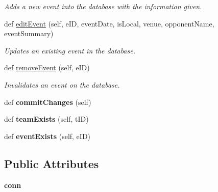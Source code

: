 \begin{DoxyCompactItemize}
\begin{DoxyCompactList}\small\item\em Adds a new event into the database with the information given. \end{DoxyCompactList}\item 
def \hyperlink{classhandler_1_1dao_1_1event__dao_1_1_event_d_a_o_af2b2e609a3c1ba67cbe472852bb46c60}{edit\+Event} (self, e\+ID, event\+Date, is\+Local, venue, opponent\+Name, event\+Summary)
\begin{DoxyCompactList}\small\item\em Updates an existing event in the database. \end{DoxyCompactList}\item 
def \hyperlink{classhandler_1_1dao_1_1event__dao_1_1_event_d_a_o_a3d8c4ff8a724203eeacb90e6cb84450e}{remove\+Event} (self, e\+ID)
\begin{DoxyCompactList}\small\item\em Invalidates an event on the database. \end{DoxyCompactList}\item 
\mbox{\label{classhandler_1_1dao_1_1event__dao_1_1_event_d_a_o_ae7236c64bac6acc44feb3bc486a2c2a4}} 
def {\bfseries commit\+Changes} (self)
\item 
\mbox{\label{classhandler_1_1dao_1_1event__dao_1_1_event_d_a_o_a29175e5866b45e2d8742dd022c8c2036}} 
def {\bfseries team\+Exists} (self, t\+ID)
\item 
\mbox{\label{classhandler_1_1dao_1_1event__dao_1_1_event_d_a_o_a7f76a329ee17a8840a0f476d5574327e}} 
def {\bfseries event\+Exists} (self, e\+ID)
\end{DoxyCompactItemize}
\subsection*{Public Attributes}
\begin{DoxyCompactItemize}
\item 
\mbox{\label{classhandler_1_1dao_1_1event__dao_1_1_event_d_a_o_a18db499e8f41f67bb40bc8fbce49f187}} 
{\bfseries conn}
\end{DoxyCompactItemize}


